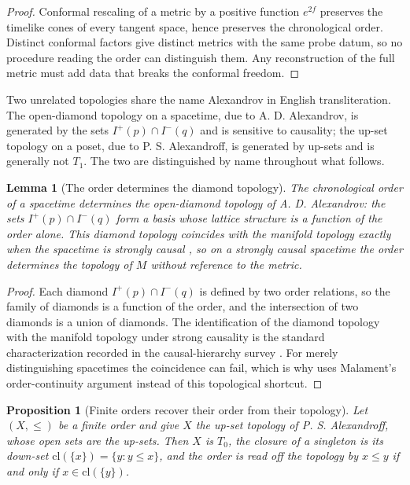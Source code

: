 \documentclass[11pt,letterpaper]{article}
\newtheorem{proposition}[theorem]{Proposition}
\newtheorem{lemma}[theorem]{Lemma}
\theoremstyle{definition}
\theoremstyle{remark}
\begin{document}
\begin{proof}
Conformal rescaling of a metric by a positive function $e^{2f}$ preserves the timelike cones of every tangent space, hence preserves the chronological order. Distinct conformal factors give distinct metrics with the same probe datum, so no procedure reading the order can distinguish them. Any reconstruction of the full metric must add data that breaks the conformal freedom.
\end{proof}

Two unrelated topologies share the name Alexandrov in English transliteration. The open-diamond topology on a spacetime, due to A. D. Alexandrov, is generated by the sets $I^+(p) \cap I^-(q)$ and is sensitive to causality; the up-set topology on a poset, due to P. S. Alexandroff, is generated by up-sets and is generally not $T_1$. The two are distinguished by name throughout what follows.

\begin{lemma}[The order determines the diamond topology]\label{lem:alexandrov}
The chronological order of a spacetime determines the open-diamond topology of A. D. Alexandrov: the sets $I^+(p) \cap I^-(q)$ form a basis whose lattice structure is a function of the order alone. This diamond topology coincides with the manifold topology exactly when the spacetime is strongly causal \cite{minguzzisanchez}, so on a strongly causal spacetime the order determines the topology of $M$ without reference to the metric.
\end{lemma}

\begin{proof}
Each diamond $I^+(p) \cap I^-(q)$ is defined by two order relations, so the family of diamonds is a function of the order, and the intersection of two diamonds is a union of diamonds. The identification of the diamond topology with the manifold topology under strong causality is the standard characterization recorded in the causal-hierarchy survey \cite{minguzzisanchez}. For merely distinguishing spacetimes the coincidence can fail, which is why  uses Malament's order-continuity argument instead of this topological shortcut.
\end{proof}

\begin{proposition}[Finite orders recover their order from their topology]\label{prop:specialization}
Let $(X, \le)$ be a finite order and give $X$ the up-set topology of P. S. Alexandroff, whose open sets are the up-sets. Then $X$ is $T_0$, the closure of a singleton is its down-set $\mathrm{cl}(\{x\}) = \{ y : y \le x \}$, and the order is read off the topology by $x \le y$ if and only if $x \in \mathrm{cl}(\{y\})$.
\end{proposition}
\end{document}
